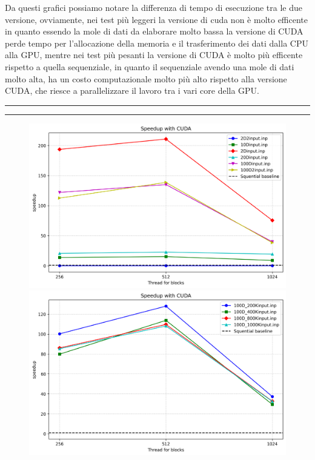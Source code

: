 \documentclass{article}
\begin{document}
  Da questi grafici possiamo notare la differenza di tempo di esecuzione tra le due versione, ovviamente, nei test più leggeri la versione di cuda non è molto efficente in quanto essendo la mole di dati da elaborare molto bassa 
  la versione di CUDA perde tempo per l'allocazione della memoria e il trasferimento dei dati dalla CPU alla GPU, mentre nei test più pesanti la versione di CUDA è molto più efficente rispetto a quella sequenziale, in quanto 
  il sequenziale avendo una mole di dati molto alta, ha un costo computazionale molto più alto rispetto alla versione CUDA, che riesce a parallelizzare il lavoro tra i vari core della GPU.
  
  \begin{center}
    \rule{2.5cm}{1pt}  \rule{2.5cm}{1pt}
  \end{center}
  \begin{figure}[ht]
    \centering
    \begin{minipage}{0.45\textwidth}
      \centering
      \includegraphics[width=\linewidth]{../test_csv/plots/speedup/plot_cuda_small_slurm.png}
    \end{minipage}
    \begin{minipage}{0.45\textwidth}
      \centering
      \includegraphics[width=\linewidth]{../test_csv/plots/speedup/plot_cuda_big_slurm.png}
    \end{minipage}
  \end{figure}
\end{document}
